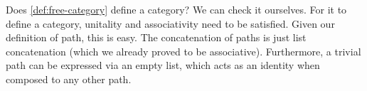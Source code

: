 Does \cref{def:free-category} define a category?
We can check it ourselves.
For it to define a category, unitality and associativity need to be satisfied.
Given our definition of path, this is easy.
The concatenation of paths is just list concatenation (which we already proved to be associative).
Furthermore, a trivial path can be expressed via an empty list, which acts as an identity when composed to any other path.
%
%

